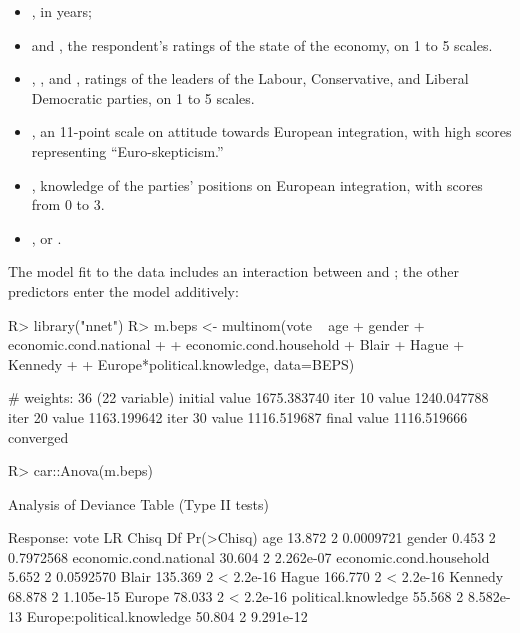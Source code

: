 \documentclass[
]{jss}
\providecommand{\tightlist}{%
  \setlength{\itemsep}{0pt}\setlength{\parskip}{0pt}}
\begin{document}
\begin{itemize}
\tightlist
\item
  , in years;
\item
   and , the
  respondent's ratings of the state of the economy, on 1 to 5 scales.
\item
  , , and , ratings of the leaders
  of the Labour, Conservative, and Liberal Democratic parties, on 1 to 5
  scales.
\item
  , an 11-point scale on attitude towards European
  integration, with high scores representing ``Euro-skepticism.''
\item
  , knowledge of the parties' positions on
  European integration, with scores from 0 to 3.
\item
  ,  or .
\end{itemize}

The model fit to the data includes an interaction between 
and ; the other predictors enter the model
additively:

\begin{CodeChunk}
\begin{CodeInput}
R> library("nnet")
R> m.beps <- multinom(vote ~ age + gender + economic.cond.national +
+                        economic.cond.household + Blair + Hague + Kennedy +
+                        Europe*political.knowledge, data=BEPS)
\end{CodeInput}
\begin{CodeOutput}
# weights:  36 (22 variable)
initial  value 1675.383740 
iter  10 value 1240.047788
iter  20 value 1163.199642
iter  30 value 1116.519687
final  value 1116.519666 
converged
\end{CodeOutput}
\begin{CodeInput}
R> car::Anova(m.beps)
\end{CodeInput}
\begin{CodeOutput}
Analysis of Deviance Table (Type II tests)

Response: vote
                           LR Chisq Df Pr(>Chisq)
age                          13.872  2  0.0009721
gender                        0.453  2  0.7972568
economic.cond.national       30.604  2  2.262e-07
economic.cond.household       5.652  2  0.0592570
Blair                       135.369  2  < 2.2e-16
Hague                       166.770  2  < 2.2e-16
Kennedy                      68.878  2  1.105e-15
Europe                       78.033  2  < 2.2e-16
political.knowledge          55.568  2  8.582e-13
Europe:political.knowledge   50.804  2  9.291e-12
\end{CodeOutput}
\end{CodeChunk}
\end{document}
